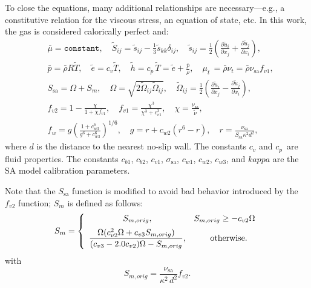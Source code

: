 \documentclass[10pt]{article}
\newcommand{\pp}[2]{\frac{\partial #1}{\partial #2}}
\newcommand{\sa}{\nu_{\mathrm{sa}}}
\newcommand{\tsa}{\mathrm{sa}}
\begin{document}
To close the equations, many additional relationships are
necessary---e.g., a constitutive relation for the viscous stress, an
equation of state, etc. In this work, the gas is considered calorically perfect and:
%
\begin{equation}
 \begin{split}\label{eq:closure}
&\bar{\mu} =\texttt{constant}, \quad \tilde{S}_{ij} = \tilde{s}_{ij} - \frac{1}{3} \tilde{s}_{kk} \delta_{ij}, \quad \tilde{s}_{ij} = \frac{1}{2} \left( \pp{\tilde{u}_i}{x_j} + \pp{\tilde{u}_j}{x_i} \right), \\
&\bar{p} = \bar{\rho} R \tilde{T}, \quad \tilde{e} = c_v \tilde{T}, \quad \tilde{h} = c_p \,  \tilde{T} = \tilde{e} + \frac{\bar{p}}{\bar{\rho}}, \quad\mu_t \, = \bar{\rho} \nu_t = \bar{\rho} \sa f_{v1}, \\
& S_{\mathrm{sa}} = \Omega + S_m, \quad \Omega = \sqrt{2 \tilde{\Omega}_{ij} \tilde{\Omega}_{ij} }, \quad \widetilde{\Omega}_{ij} = \frac{1}{2} \left( \pp{\tilde{u}_i}{x_j} - \pp{\tilde{u}_j}{x_i} \right), \\
&f_{v2} = 1 - \frac{\chi}{1 + \chi f_{v1}}, \quad f_{v1} = \frac{\chi^3}{\chi^3 + c_{v1}^3}, \quad \chi = \frac{\sa}{\tilde{\nu}}, \\
&f_w = g \left( \frac{1 + c_{w3}^6}{g^6 + c_{w3}^6} \right)^{1/6}, \quad g = r + c_{w2} \left( r^6 - r \right), \quad r = \frac{\sa}{S_{\mathrm{sa}} \kappa^2  d^2}, 
 \end{split}
\end{equation}
%
where $d$ is the distance to the nearest no-slip wall. The constants $c_v$ and $c_p \, $ are fluid properties.  The constants $c_{b1}$, $c_{b2}$, $c_{v1}$, $\sigma_{\tsa}$,
$c_{w1}$, $c_{w2}$, $c_{w3}$, and $kappa $ are the SA model calibration parameters.

Note that the $S_{\mathrm{sa}}$ function is
modified to avoid bad behavior introduced by the $f_{v2}$ function; $S_m$ is defined as follows:
\begin{equation*}
S_m = \left\{ \begin{array}{cc}
S_{m, orig}, & S_{m,orig} \geq -c_{v2} \Omega \vspace{5pt}\\ 
\dfrac{\Omega (c_{v2}^2 \Omega + c_{v3} S_{m,orig})}{ (c_{v3}-2.0c_{v2}) \Omega - S_{m,orig}}, & \quad \mathrm{otherwise}.
\end{array}
\right.
\end{equation*}
with 
\begin{equation*}
S_{m, orig} = \frac{\sa}{\kappa^2 \, d^2} f_{v2}.
\end{equation*}
\end{document}
